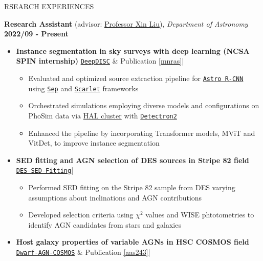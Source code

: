 \documentclass[10pt]{article} %
\begin{document}
\begin{section}{RSEARCH EXPERIENCES}

\textbf{Research Assistant} (advisor: \href{mailto:xinliuxl@illinois.edu}{Professor Xin Liu}), \textit{Department of Astronomy} \hfill \textbf{2022/09 - Present} 
\begin{itemize}[leftmargin=1.5em]
    \item \label{project1} \textbf{Instance segmentation in sky surveys with deep learning (NCSA SPIN internship)} 
    \hfill {\footnotesize \href{https://github.com/burke86/deepdisc}{\texttt{DeepDISC}} \& Publication \ref{mnras}}| %
    \begin{itemize}[leftmargin=1.5em]
        \item Evaluated and optimized source extraction pipeline for \href{https://github.com/burke86/astro_rcnn}{\texttt{Astro R-CNN}} using \href{https://github.com/kbarbary/sep/tree/v1.1.x}{\texttt{Sep}} and \href{https://github.com/pmelchior/scarlet}{\texttt{Scarlet}} frameworks
        \item Orchestrated simulations employing diverse models and configurations on PhoSim data via \href{https://www.ncsa.illinois.edu/research/project-highlights/hal-cluster/}{HAL cluster} with \href{https://github.com/facebookresearch/detectron2}{\texttt{Detectron2}}
        \item Enhanced the pipeline by incorporating Transformer models, MViT and VitDet, to improve instance segmentation
    \end{itemize}
    \item \textbf{SED fitting and AGN selection of DES sources in Stripe 82 field} 
    \hfill {\footnotesize \href{https://github.com/Chisen-Lupus/DES-SED-fitting}{\texttt{DES-SED-Fitting}}}| %
    \begin{itemize}[leftmargin=1.5em]
        \item Performed SED fitting on the Stripe 82 sample from DES varying assumptions about inclinations and AGN contributions
        \item Developed selection criteria using $\chi^2$ values and WISE phtotometries to identify AGN candidates from stars and galaxies
    \end{itemize}
    \item \textbf{Host galaxy properties of variable AGNs in HSC COSMOS field} 
    \hfill {\footnotesize \href{https://github.com/burke86/dwarf_agn_cosmos}{\texttt{Dwarf-AGN-COSMOS}} \& Publication \ref{aas243}}| %

\end{itemize}
\end{section}
\end{document}
